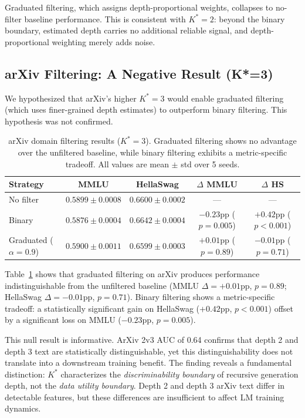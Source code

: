 \documentclass[11pt,a4paper]{article}
\begin{document}
Graduated filtering, which assigns depth-proportional weights, collapses to no-filter baseline performance. This is consistent with $K^*{=}2$: beyond the binary boundary, estimated depth carries no additional reliable signal, and depth-proportional weighting merely adds noise.

\subsection{arXiv Filtering: A Negative Result (K*=3)}
\label{sec:arxiv_filtering}

We hypothesized that arXiv's higher $K^*{=}3$ would enable graduated filtering (which uses finer-grained depth estimates) to outperform binary filtering. This hypothesis was not confirmed.

\begin{table}[t]
\centering
\caption{arXiv domain filtering results ($K^*{=}3$). Graduated filtering shows no advantage over the unfiltered baseline, while binary filtering exhibits a metric-specific tradeoff. All values are mean $\pm$ std over 5 seeds.}
\label{tab:arxiv_filtering}
\small
\begin{tabular}{lcccc}
\toprule
\textbf{Strategy} & \textbf{MMLU} & \textbf{HellaSwag} & \textbf{$\Delta$ MMLU} & \textbf{$\Delta$ HS} \\
\midrule
No filter & $0.5899 \pm 0.0008$ & $0.6600 \pm 0.0002$ & --- & --- \\
Binary & $0.5876 \pm 0.0004$ & $0.6642 \pm 0.0004$ & $-0.23$pp ($p{=}0.005$) & $+0.42$pp ($p{<}0.001$) \\
Graduated ($\alpha{=}0.9$) & $0.5900 \pm 0.0011$ & $0.6599 \pm 0.0003$ & $+0.01$pp ($p{=}0.89$) & $-0.01$pp ($p{=}0.71$) \\
\bottomrule
\end{tabular}
\end{table}

Table~\ref{tab:arxiv_filtering} shows that graduated filtering on arXiv produces performance indistinguishable from the unfiltered baseline (MMLU $\Delta = +0.01$pp, $p{=}0.89$; HellaSwag $\Delta = -0.01$pp, $p{=}0.71$). Binary filtering shows a metric-specific tradeoff: a statistically significant gain on HellaSwag ($+0.42$pp, $p{<}0.001$) offset by a significant loss on MMLU ($-0.23$pp, $p{=}0.005$).

This null result is informative. ArXiv 2v3 AUC of 0.64 confirms that depth 2 and depth 3 text are statistically distinguishable, yet this distinguishability does not translate into a downstream training benefit. The finding reveals a fundamental distinction: $K^*$ characterizes the \emph{discriminability boundary} of recursive generation depth, not the \emph{data utility boundary}. Depth 2 and depth 3 arXiv text differ in detectable features, but these differences are insufficient to affect LM training dynamics.
\end{document}

